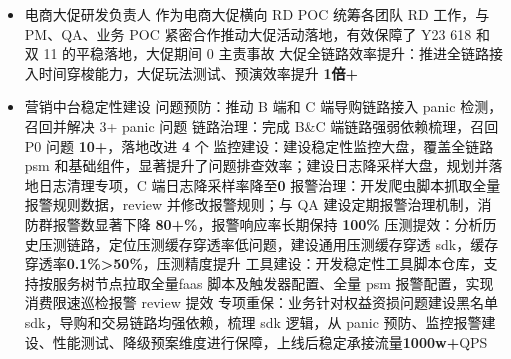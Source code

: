 \documentclass[11pt,a4paper]{moderncv}
\begin{document}
{\begin{itemize}
        \newline 稳定性建设：针对权益发放与核销阶段资损风险建设并落地多项对账，召回多个业务风险并修复
         \item \textcolor[RGB]{64,127,191}{电商大促研发负责人}
        \newline 作为电商大促横向 RD POC 统筹各团队 RD 工作，与 PM、QA、业务 POC 紧密合作推动大促活动落地，有效保障了 Y23 618 和 双 11 的平稳落地，大促期间 0 主责事故
        \newline 大促全链路效率提升：推进全链路接入时间穿梭能力，大促玩法测试、预演效率提升 \textbf{1倍+}
        \item \textcolor[RGB]{64,127,191}{营销中台稳定性建设}
        \newline 问题预防：推动 B 端和 C 端导购链路接入 panic 检测，召回并解决 3+ panic 问题
        \newline 链路治理：完成 B\&C 端链路强弱依赖梳理，召回 P0 问题 \textbf{10+}，落地改进 \textbf{4} 个
        \newline 监控建设：建设稳定性监控大盘，覆盖全链路 psm 和基础组件，显著提升了问题排查效率；建设日志降采样大盘，规划并落地日志清理专项，C 端日志降采样率降至\textbf{0}
        \newline 报警治理：开发爬虫脚本抓取全量报警规则数据，review 并修改报警规则；与 QA 建设定期报警治理机制，消防群报警数显著下降 \textbf{80+\%}，报警响应率长期保持 \textbf{100\%}
        \newline 压测提效：分析历史压测链路，定位压测缓存穿透率低问题，建设通用压测缓存穿透 sdk，缓存穿透率\textbf{0.1\%\->50\%}，压测精度提升
        \newline 工具建设：开发稳定性工具脚本仓库，支持按服务树节点拉取全量faas 脚本及触发器配置、全量 psm 报警配置，实现消费限速巡检报警 review 提效
        \newline 专项重保：业务针对权益资损问题建设黑名单 sdk，导购和交易链路均强依赖，梳理 sdk 逻辑，从 panic 预防、监控报警建设、性能测试、降级预案维度进行保障，上线后稳定承接流量\textbf{1000w+}QPS
    \end{itemize}}
\end{document}
